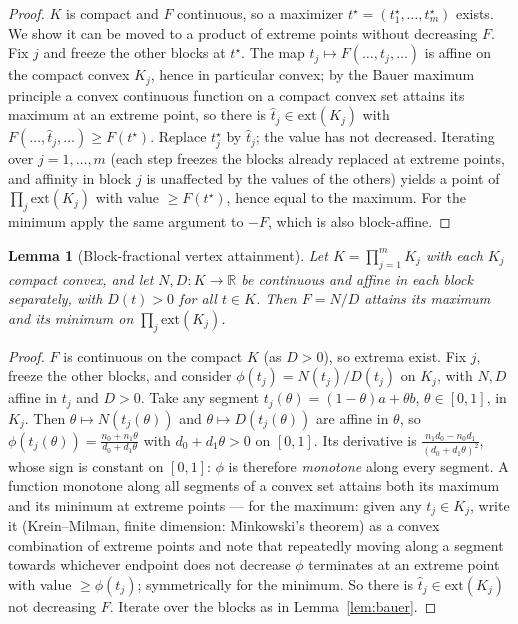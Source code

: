 \documentclass[11pt]{article}
\newtheorem{lemma}{Lemma}
\theoremstyle{definition}
\newcommand{\ext}{\mathrm{ext}}
\begin{document}
\begin{proof}
$K$ is compact and $F$ continuous, so a maximizer $t^\star=(t_1^\star,\dots,t_m^\star)$ exists. We
show it can be moved to a product of extreme points without decreasing $F$. Fix $j$ and freeze the
other blocks at $t^\star$. The map $t_j\mapsto F(\dots,t_j,\dots)$ is affine on the compact convex
$K_j$, hence in particular convex; by the Bauer maximum principle a convex continuous function on a
compact convex set attains its maximum at an extreme point, so there is
$\hat t_j\in\ext(K_j)$ with $F(\dots,\hat t_j,\dots)\ge F(t^\star)$. Replace $t_j^\star$ by
$\hat t_j$; the value has not decreased. Iterating over $j=1,\dots,m$ (each step freezes the blocks
already replaced at extreme points, and affinity in block $j$ is unaffected by the values of the
others) yields a point of $\prod_j\ext(K_j)$ with value $\ge F(t^\star)$, hence equal to the maximum.
For the minimum apply the same argument to $-F$, which is also block-affine.
\end{proof}

\begin{lemma}[Block-fractional vertex attainment]\label{lem:fractional}
Let $K=\prod_{j=1}^m K_j$ with each $K_j$ compact convex, and let $N,D:K\to\mathbb R$ be continuous
and affine in each block separately, with $D(t)>0$ for all $t\in K$. Then $F=N/D$ attains its maximum
and its minimum on $\prod_j\ext(K_j)$.
\end{lemma}

\begin{proof}
$F$ is continuous on the compact $K$ (as $D>0$), so extrema exist. Fix $j$, freeze the other blocks,
and consider $\phi(t_j)=N(t_j)/D(t_j)$ on $K_j$, with $N,D$ affine in $t_j$ and $D>0$. Take any
segment $t_j(\theta)=(1-\theta)a+\theta b$, $\theta\in[0,1]$, in $K_j$. Then
$\theta\mapsto N(t_j(\theta))$ and $\theta\mapsto D(t_j(\theta))$ are affine in $\theta$, so
$\phi(t_j(\theta))=\frac{n_0+n_1\theta}{d_0+d_1\theta}$ with $d_0+d_1\theta>0$ on $[0,1]$. Its
derivative is $\frac{n_1d_0-n_0d_1}{(d_0+d_1\theta)^2}$, whose sign is constant on $[0,1]$: $\phi$ is
therefore \emph{monotone} along every segment. A function monotone along all segments of a convex set
attains both its maximum and its minimum at extreme points --- for the maximum: given any
$t_j\in K_j$, write it (Krein--Milman, finite dimension: Minkowski's theorem) as a convex combination
of extreme points and note that repeatedly moving along a segment towards whichever endpoint does not
decrease $\phi$ terminates at an extreme point with value $\ge\phi(t_j)$; symmetrically for the
minimum. So there is $\hat t_j\in\ext(K_j)$ not decreasing $F$. Iterate over the blocks as in
Lemma~\ref{lem:bauer}.
\end{proof}
\end{document}
